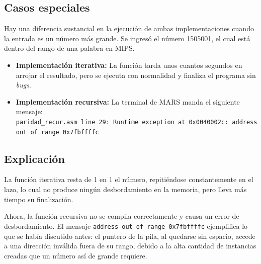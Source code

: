 \documentclass[12pt]{article}
\begin{document}
\subsection*{Casos especiales}
Hay una diferencia sustancial en la ejecución de ambas implementaciones cuando la entrada es un número más grande. Se ingresó el número 1505001, el cual está dentro del rango de una palabra en MIPS.

\begin{itemize}
    \item \textbf{Implementación iterativa:} La función tarda unos cuantos segundos en arrojar el resultado, pero se ejecuta con normalidad y finaliza el programa sin \textit{bugs}.
    \item \textbf{Implementación recursiva:} La terminal de MARS manda el siguiente mensaje: \\
    \texttt{paridad\_recur.asm line 29: Runtime exception at 0x0040002c: address out of range 0x7fbffffc}
\end{itemize}

\subsection*{Explicación}
La función iterativa resta de 1 en 1 el número, repitiéndose constantemente en el lazo, lo cual no produce ningún desbordamiento en la memoria, pero lleva más tiempo su finalización.

Ahora, la función recursiva no se compila correctamente y causa un error de desbordamiento. El mensaje \texttt{address out of range 0x7fbffffc} ejemplifica lo que se había discutido antes: el puntero de la pila, al quedarse sin espacio, accede a una dirección inválida fuera de su rango, debido a la alta cantidad de instancias creadas que un número así de grande requiere.
\end{document}
